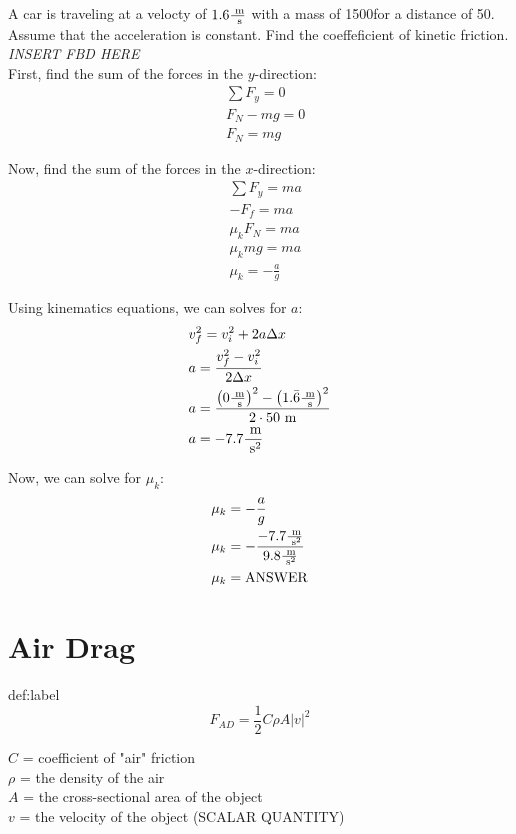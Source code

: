 \begin{problem}
	A car is traveling at a velocty of $1.6 \frac{\text{ m}}{\text{ s}}$ with a mass of 1500\kg \text{ }for a distance of 50\m. Assume that the acceleration is constant. Find the coeffeficient of kinetic friction. \\

	\textit{INSERT FBD HERE}\\

	First, find the sum of the forces in the $y$-direction:
	$$
	\begin{aligned}
		&\sum F_y = 0\\
		&F_N - mg = 0\\
		&F_N = mg
	\end{aligned}
	$$

	Now, find the sum of the forces in the $x$-direction:
	$$
	\begin{aligned}
		&\sum F_y = ma\\
		&-F_f = ma\\
		&\mu_k F_N = ma\\
		&\mu_k mg = ma\\
		&\mu_k = -\frac{a}{g}
	\end{aligned}
	$$

	Using kinematics equations, we can solves for $a$:
	$$
	\begin{aligned}
		&v_f^2 = v_i^2 + 2a\Delta x\\
		&a = \frac{v_f^2-v_i^2}{2 \Delta x}\\
		&a = \frac{\left(0\frac{\text{ m}}{\text{ s}}\right)^2 - \left(1.\bar{6} \frac{\text{ m}}{\text{ s}}\right)^2}{2 \cdot 50 \text{ m}}\\
		&a = -7.7 \frac{\text{ m}}{\text{ s}^2}
	\end{aligned}
	$$

	Now, we can solve for $\mu_k$:
	$$
	\begin{aligned}
		&\mu_k = -\frac{a}{g}\\
		&\mu_k = -\frac{-7.7 \frac{\text{ m}}{\text{ s}^2}}{9.8 \frac{\text{ m}}{\text{ s}^2}}\\
		&\mu_k = \text{ANSWER}
	\end{aligned}
	$$
\end{problem}


\section{Air Drag}

\begin{definition}{def:label}
	$$
		F_{AD} = \frac{1}{2}C\rho A|v|^2
	$$

	$C$ = coefficient of "air" friction\\
	$\rho$ = the density of the air\\
	$A$ = the cross-sectional area of the object\\
	$v$ = the velocity of the object (SCALAR QUANTITY)
\end{definition}


